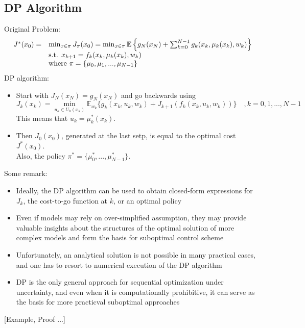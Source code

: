\subsection{DP Algorithm}
Original Problem:
\[
    \begin{array}{ll}
        J^*(x_0) =  & \min_{x\in\pi} J_\pi(x_0) = \min_{x\in\pi} \mathbb{E} \left\{ g_N(x_N) + \sum_{k=0}^{N-1} g_k(x_k,\mu_k(x_k),w_k) \right\} \\
                    &\text{\rm s.t. } x_{k+1} = f_k(x_k,\mu_k(x_k),w_k) \\
                    &\text{\rm where } \pi = \{ \mu_0,\mu_1,...,\mu_{N-1} \}
    \end{array}
\]
DP algorithm:
\begin{itemize}
    \item Start with $J_N(x_N)=g_N(x_N)$ and go backwards using
    \[
        J_k(x_k) = \min_{u_k\in U_k(x_k)} \mathbb{E}_{w_k} \{ g_k(x_k,u_k,w_k) + J_{k+1}\left( f_k(x_k,u_k,w_k) \right) \}\quad , k=0,1,...,N-1
    \]
    This means that $u_k=\mu^*_k(x_k)$.
    \item Then $J_0(x_0)$, generated at the last setp, is equal to the optimal cost $J^*(x_0)$. \\ Also, the policy $\pi^*=\{\mu_0^*,...,\mu_{N-1}^*\}$.
\end{itemize}
Some remark:
\begin{itemize}
    \item Ideally, the DP algorithm can be used to obtain closed-form expressions for $J_k$, the cost-to-go function at $k$, or an optimal policy
    \item Even if models may rely on over-simplified assumption, they may provide valuable insights about the structures of the optimal solution of more complex models and form the basis for suboptimal control scheme
    \item Unfortunately, an analytical solution is not possible in many practical cases, and one has to resort to numerical execution of the DP algorithm
    \item DP is the only general approach for sequential optimization under uncertainty, and even when it is computationally prohibitive, it can serve as the basis for more practicval suboptimal approaches
\end{itemize}
[Example, Proof ...]

